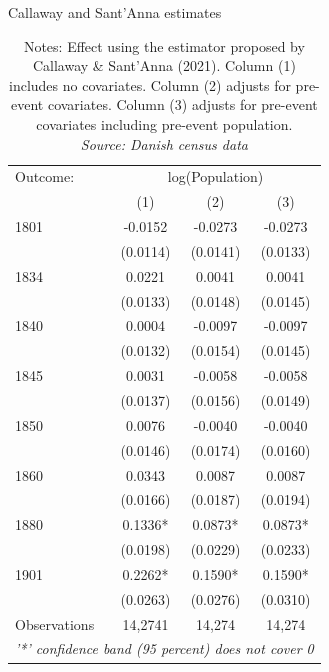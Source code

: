 \begin{table}[H]
\centering
\caption{\label{tab:cs_estimates} Callaway and Sant'Anna estimates}
\footnotesize
\begin{tabular}{lccc}
   \tabularnewline \midrule \midrule
   Outcome: & \multicolumn{3}{c}{log(Population)}\\
            & (1)           & (2)             & (3)\\  
   \midrule
    1801 & -0.0152      & -0.0273     & -0.0273 \\
         & (0.0114)     & (0.0141)    & (0.0133) \\
    1834 & 0.0221       & 0.0041      & 0.0041 \\
         & (0.0133)     & (0.0148)    & (0.0145) \\
    1840 & 0.0004       & -0.0097     & -0.0097 \\
         & (0.0132)     & (0.0154)    & (0.0145) \\
    1845 & 0.0031       & -0.0058     & -0.0058 \\
         & (0.0137)     & (0.0156)    & (0.0149) \\
    1850 & 0.0076       & -0.0040     & -0.0040 \\
         & (0.0146)     & (0.0174)    & (0.0160) \\
    1860 & 0.0343       & 0.0087      & 0.0087 \\
         & (0.0166)     & (0.0187)    & (0.0194) \\
    1880 & 0.1336*      & 0.0873*     & 0.0873* \\
         & (0.0198)     & (0.0229)    & (0.0233) \\
    1901 & 0.2262*      & 0.1590*     & 0.1590* \\
         & (0.0263)     & (0.0276)    & (0.0310)\\  
   \midrule
   Observations & 14,2741 & 14,274 & 14,274\\
   \midrule \midrule
   \multicolumn{4}{l}{\emph{'*' confidence band (95 percent) does not cover 0}}\\
\end{tabular}
\parbox{0.6\textwidth}{
\caption*{Notes: Effect using the estimator proposed by Callaway \& Sant’Anna (2021). Column (1) includes no covariates. Column (2) adjusts for pre-event covariates. Column (3) adjusts for pre-event covariates including pre-event population. \\ \textit{Source: Danish census data}}
}

\end{table}

